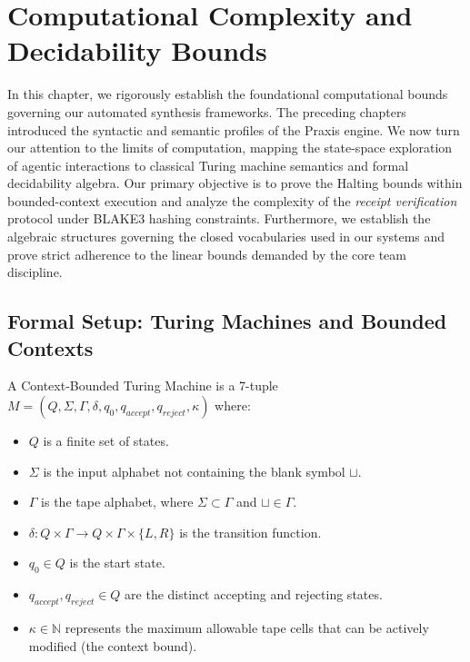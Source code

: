 \chapter{Computational Complexity and Decidability Bounds}
\label{ch:computational_complexity}

In this chapter, we rigorously establish the foundational computational bounds governing our automated synthesis frameworks. The preceding chapters introduced the syntactic and semantic profiles of the Praxis engine. We now turn our attention to the limits of computation, mapping the state-space exploration of agentic interactions to classical Turing machine semantics and formal decidability algebra. Our primary objective is to prove the Halting bounds within bounded-context execution and analyze the complexity of the \textit{receipt verification} protocol under BLAKE3 hashing constraints. Furthermore, we establish the algebraic structures governing the closed vocabularies used in our systems and prove strict adherence to the linear bounds demanded by the core team discipline.

\section{Formal Setup: Turing Machines and Bounded Contexts}

\begin{definition}
\label{def:cbtm}
A Context-Bounded Turing Machine is a 7-tuple $M = (Q, \Sigma, \Gamma, \delta, q_0, q_{accept}, q_{reject}, \kappa)$ where:
\begin{itemize}
    \item $Q$ is a finite set of states.
    \item $\Sigma$ is the input alphabet not containing the blank symbol $\sqcup$.
    \item $\Gamma$ is the tape alphabet, where $\Sigma \subset \Gamma$ and $\sqcup \in \Gamma$.
    \item $\delta: Q \times \Gamma \rightarrow Q \times \Gamma \times \{L, R\}$ is the transition function.
    \item $q_0 \in Q$ is the start state.
    \item $q_{accept}, q_{reject} \in Q$ are the distinct accepting and rejecting states.
    \item $\kappa \in \mathbb{N}$ represents the maximum allowable tape cells that can be actively modified (the context bound).
\end{itemize}
\end{definition}

